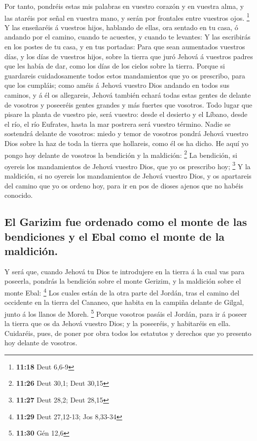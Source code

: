  Por tanto, pondréis estas mis palabras en vuestro corazón
y en vuestra alma, y las ataréis por señal en vuestra mano, y serán por
frontales entre vuestros ojos. \footnote{\textbf{11:18} Deut 6,6-9}
 Y las enseñaréis á vuestros hijos, hablando de ellas, ora
sentado en tu casa, ó andando por el camino, cuando te acuestes, y
cuando te levantes:  Y las escribirás en los postes de tu
casa, y en tus portadas:  Para que sean aumentados vuestros
días, y los días de vuestros hijos, sobre la tierra que juró Jehová á
vuestros padres que les había de dar, como los días de los cielos sobre
la tierra.  Porque si guardareis cuidadosamente todos estos
mandamientos que yo os prescribo, para que los cumpláis; como améis á
Jehová vuestro Dios andando en todos sus caminos, y á él os allegareis,
 Jehová también echará todas estas gentes de delante de
vosotros y poseeréis gentes grandes y más fuertes que vosotros.
 Todo lugar que pisare la planta de vuestro pie, será
vuestro: desde el desierto y el Líbano, desde el río, el río Eufrates,
hasta la mar postrera será vuestro término.  Nadie se
sostendrá delante de vosotros: miedo y temor de vosotros pondrá Jehová
vuestro Dios sobre la haz de toda la tierra que hollareis, como él os ha
dicho.  He aquí yo pongo hoy delante de vosotros la
bendición y la maldición: \footnote{\textbf{11:26} Deut 30,1; Deut 30,15}
 La bendición, si oyereis los mandamientos de Jehová
vuestro Dios, que yo os prescribo hoy; \footnote{\textbf{11:27} Deut
  28,2; Deut 28,15}  Y la maldición, si no oyereis los
mandamientos de Jehová vuestro Dios, y os apartareis del camino que yo
os ordeno hoy, para ir en pos de dioses ajenos que no habéis conocido.

\hypertarget{el-garizim-fue-ordenado-como-el-monte-de-las-bendiciones-y-el-ebal-como-el-monte-de-la-maldiciuxf3n.}{%
\subsection{El Garizim fue ordenado como el monte de las bendiciones y
el Ebal como el monte de la
maldición.}\label{el-garizim-fue-ordenado-como-el-monte-de-las-bendiciones-y-el-ebal-como-el-monte-de-la-maldiciuxf3n.}}

 Y será que, cuando Jehová tu Dios te introdujere en la
tierra á la cual vas para poseerla, pondrás la bendición sobre el monte
Gerizim, y la maldición sobre el monte Ebal: \footnote{\textbf{11:29}
  Deut 27,12-13; Jos 8,33-34}  Los cuales están de la otra
parte del Jordán, tras el camino del occidente en la tierra del Cananeo,
que habita en la campiña delante de Gilgal, junto á los llanos de Moreh.
\footnote{\textbf{11:30} Gén 12,6}  Porque vosotros pasáis
el Jordán, para ir á poseer la tierra que os da Jehová vuestro Dios; y
la poseeréis, y habitaréis en ella.  Cuidaréis, pues, de
poner por obra todos los estatutos y derechos que yo presento hoy
delante de vosotros.

